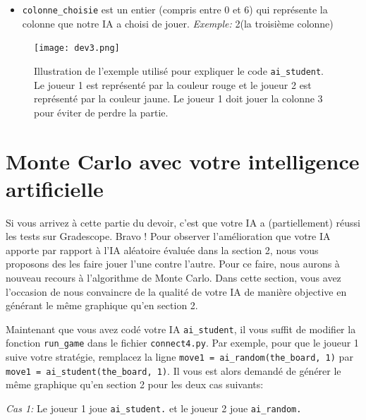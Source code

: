\documentclass[11pt,answers]{exam}
\begin{document}
\begin{itemize}
	\item \texttt{colonne\_choisie} est un entier (compris entre 0 et 6) qui représente la colonne que notre IA a choisi de jouer. \emph{Exemple:} 2(la troisième colonne)
\end{itemize}

\bigskip

\begin{figure}[!ht]
	\centering
	\texttt{[image: dev3.png]}
 	\caption{Illustration de l'exemple utilisé pour expliquer le code \texttt{ai\_student}. Le joueur 1 est représenté par la couleur rouge et le joueur 2 est représenté par la couleur jaune. Le joueur 1 doit jouer la colonne 3 pour éviter de perdre la partie.}
	\label{fig:ex_sec3}
\end{figure}

\newpage

\section{Monte Carlo avec votre intelligence artificielle}

Si vous arrivez à cette partie du devoir, c'est que votre IA a (partiellement) réussi les tests sur Gradescope. Bravo ! Pour observer l'amélioration que votre IA apporte par rapport à l'IA aléatoire évaluée dans la section 2, nous vous proposons des les faire jouer l'une contre l'autre. Pour ce faire, nous aurons à nouveau recours à l'algorithme de Monte Carlo. Dans cette section, vous avez l'occasion de nous convaincre de la qualité de votre IA de manière objective en générant le même graphique qu'en section 2.

\bigskip

Maintenant que vous avez codé votre IA \texttt{ai\_student}, il vous suffit de modifier la fonction \texttt{run\_game} dans le fichier \texttt{connect4.py}. Par exemple, pour que le joueur 1 suive votre stratégie, remplacez la ligne \texttt{move1 = ai\_random(the\_board, 1)} par \texttt{move1 = ai\_student(the\_board, 1)}. Il vous est alors demandé de générer le même graphique qu'en section 2 pour les deux cas suivants:

\newpage

\emph{Cas 1:} Le joueur 1 joue \texttt{ai\_student.} et le joueur 2 joue \texttt{ai\_random.}
\end{document}
